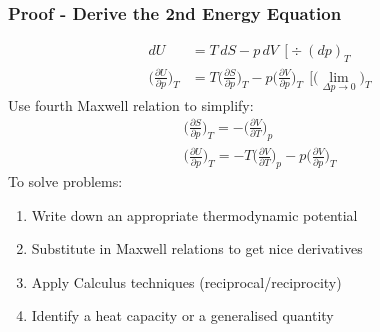 \documentclass[a4paper, 11pt, normalem]{report}
\newcommand\p{\partial}
\begin{document}
\subsubsection{Proof - Derive the 2nd Energy Equation}
\begin{align*}
    dU &= T\,dS - p\,dV ~~\bigg[\div (dp)_T \\
    \Big(\frac{\p U}{\p p}\Big)_T &= T\Big(\frac{\p S}{\p p}\Big)_T - p\Big(\frac{\p V}{\p p}\Big)_T ~~\bigg[\big(\lim_{\Delta p \to 0}\big)_T
\end{align*}
Use fourth Maxwell relation to simplify:
\begin{gather*}
    \Big(\frac{\p S}{\p p} \Big)_T = -\Big(\frac{\p V}{\p T}\Big)_p \\
    \Big(\frac{\p U}{\p p}\Big)_T = -T\Big(\frac{\p V}{\p T}\Big)_p - p\Big(\frac{\p V}{\p p}\Big)_T
\end{gather*}
To solve problems:
\begin{enumerate}
    \item Write down an appropriate thermodynamic potential
    \item Substitute in Maxwell relations to get nice derivatives
    \item Apply Calculus techniques (reciprocal/reciprocity)
    \item Identify a heat capacity or a generalised quantity
\end{enumerate}
\end{document}

